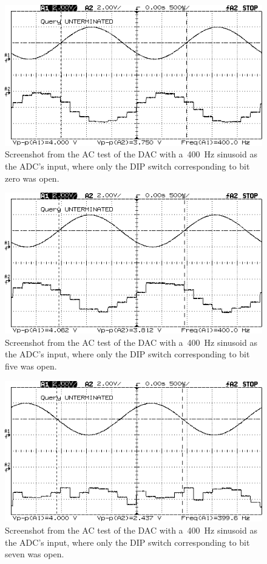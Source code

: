 \begin{figure}[H]
	\centering
	\includegraphics[width=.6\textwidth]{img/shot/pt4b_bit0.png}
	\parbox{.6\textwidth}{
	\caption[\SI{400}{\hertz} Sine Wave --- Bit 0 Open]{Screenshot from the AC test of the DAC with a~\SI{400}{\hertz} sinusoid as the ADC's input, where only the DIP switch corresponding to bit zero was open.}
	\label{fig:pt4b_bit0}}
\end{figure}

\begin{figure}[H]
	\centering
	\includegraphics[width=.6\textwidth]{img/shot/pt4b_bit5.png}
	\parbox{.6\textwidth}{
	\caption[\SI{400}{\hertz} Sine Wave --- Bit 5 Open]{Screenshot from the AC test of the DAC with a~\SI{400}{\hertz} sinusoid as the ADC's input, where only the DIP switch corresponding to bit five was open.}
	\label{fig:pt4b_bit5}}
\end{figure}

\begin{figure}[H]
	\centering
	\includegraphics[width=.6\textwidth]{img/shot/pt4b_bit7.png}
	\parbox{.6\textwidth}{
	\caption[\SI{400}{\hertz} Sine Wave --- Bit 7 Open]{Screenshot from the AC test of the DAC with a~\SI{400}{\hertz} sinusoid as the ADC's input, where only the DIP switch corresponding to bit seven was open.}
	\label{fig:pt4b_bit7}}
\end{figure}
